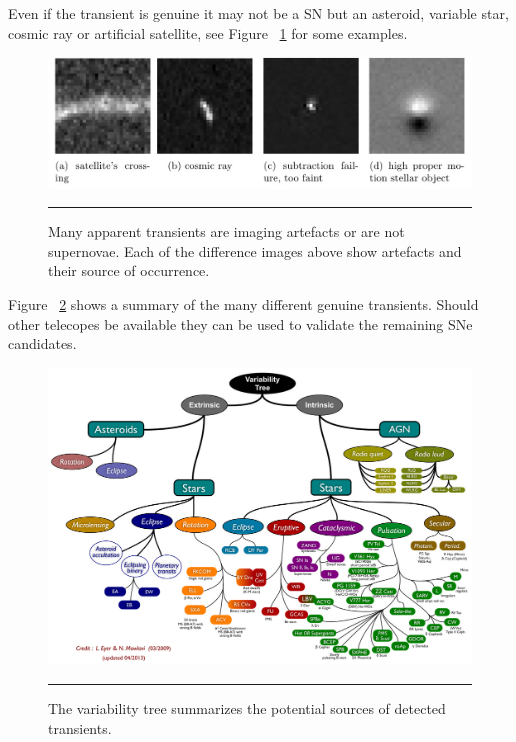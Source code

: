 Even if the transient is genuine it may not be a SN but an asteroid, variable star, cosmic ray or artificial satellite, see Figure ~\ref{fig:transient_examples} for some examples.
\begin{figure}[htbp]
	\centering
		\includegraphics[width = 1.0\textwidth]{./Figures/transient_examples_Real-time_detection_of_transients_in.jpg}
		\rule{35em}{0.5pt}
	\caption[Artefacts]{Many apparent transients are imaging artefacts or are not supernovae. Each of the difference images above show artefacts and their source of occurrence.}
	\label{fig:transient_examples}
\end{figure}

Figure ~\ref{fig:transient_types} shows a summary of the many different genuine transients.
Should other telecopes be available they can be used to validate the remaining SNe candidates\citep{adelman2008sixth}.
\begin{figure}[htbp]
	\centering
		\includegraphics[width = 1.0\textwidth]{./Figures/Transient_types_Thirty_metre_deatiled_science_case.jpg}
		\rule{35em}{0.5pt}
	\caption[Transient Variability]{The variability tree summarizes the potential sources of detected transients.}
	\label{fig:transient_types}
\end{figure}

